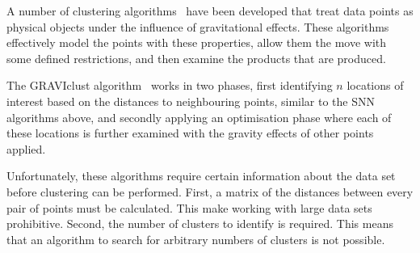 A number of clustering algorithms~\cite{zhong2010novel} have been developed
that treat data points as physical objects under the influence of gravitational
effects.  These algorithms effectively model the points with these properties,
allow them the move with some defined restrictions, and then examine the
products that are produced.

The GRAVIclust algorithm~\cite{indulska2002gravity} works in two phases, first
identifying $n$ locations of interest based on the distances to neighbouring
points, similar to the SNN algorithms above, and secondly applying an
optimisation phase where each of these locations is further examined with the
gravity effects of other points applied.

Unfortunately, these algorithms require certain information about the data set
before clustering can be performed. First, a matrix of the distances between
every pair of points must be calculated. This make working with large data sets
prohibitive. Second, the number of clusters to identify is required. This means
that an algorithm to search for arbitrary numbers of clusters is not possible.
